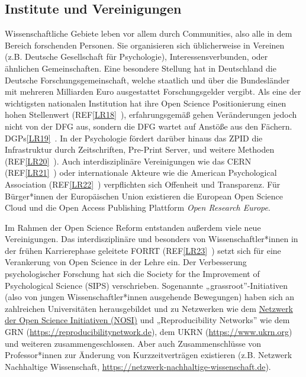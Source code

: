 \documentclass[
  letterpaper,
  DIV=11,
  numbers=noendperiod]{scrreprt}
\begin{document}
\subsection{Institute und
Vereinigungen}\label{institute-und-vereinigungen}

Wissenschaftliche Gebiete leben vor allem durch Communities, also alle
in dem Bereich forschenden Personen. Sie organisieren sich üblicherweise
in Vereinen (z.B. Deutsche Gesellschaft für Psychologie),
Interessensverbunden, oder ähnlichen Gemeinschaften. Eine besondere
Stellung hat in Deutschland die Deutsche Forschungsgemeinschaft, welche
staatlich und über die Bundesländer mit mehreren Milliarden Euro
ausgestattet Forschungsgelder vergibt. Als eine der wichtigsten
nationalen Institution hat ihre Open Science Positionierung einen hohen
Stellenwert (REF\hyperref[_msocom_18]{{[}LR18{]}}~), erfahrungsgemäß
gehen Veränderungen jedoch nicht von der DFG aus, sondern die DFG wartet
auf Anstöße aus den Fächern. DGPs\hyperref[_msocom_19]{{[}LR19{]}}~. In
der Psychologie fördert darüber hinaus das ZPID die Infrastruktur durch
Zeitschriften, Pre-Print Server, und weitere Methoden
(REF\hyperref[_msocom_20]{{[}LR20{]}}~). Auch interdisziplinäre
Vereinigungen wie das CERN (REF\hyperref[_msocom_21]{{[}LR21{]}}~) oder
internationale Akteure wie die American Psychological Association
(REF\hyperref[_msocom_22]{{[}LR22{]}}~) verpflichten sich Offenheit und
Transparenz. Für Bürger*innen der Europäischen Union existieren die
European Open Science Cloud und die Open Access Publishing Plattform
\emph{Open Research Europe}.

Im Rahmen der Open Science Reform entstanden außerdem viele neue
Vereinigungen. Das interdisziplinäre und besonders von
Wissenschaftler*innen in der frühen Karrierephase geleitete FORRT
(REF\hyperref[_msocom_23]{{[}LR23{]}}~) setzt sich für eine Verankerung
von Open Science in der Lehre ein. Der Verbesserung psychologischer
Forschung hat sich die Society for the Improvement of Psychological
Science (SIPS) verschrieben. Sogenannte „grassroot''-Initiativen (also
von jungen Wissenschaftler*innen ausgehende Bewegungen) haben sich an
zahlreichen Universitäten herausgebildet und zu Netzwerken wie dem
\href{https://osf.io/tbkzh/}{Netzwerk der Open Science Initiativen
(NOSI)} und „Reproducibility Networks'' wie dem GRN
(\url{https://reproducibilitynetwork.de}), dem UKRN
(\url{https://www.ukrn.org}) und weiteren zusammengeschlossen. Aber auch
Zusammenschlüsse von Professor*innen zur Änderung von Kurzzeitverträgen
existieren (z.B. Netzwerk Nachhaltige Wissenschaft,
\url{https://netzwerk-nachhaltige-wissenschaft.de}).
\end{document}
